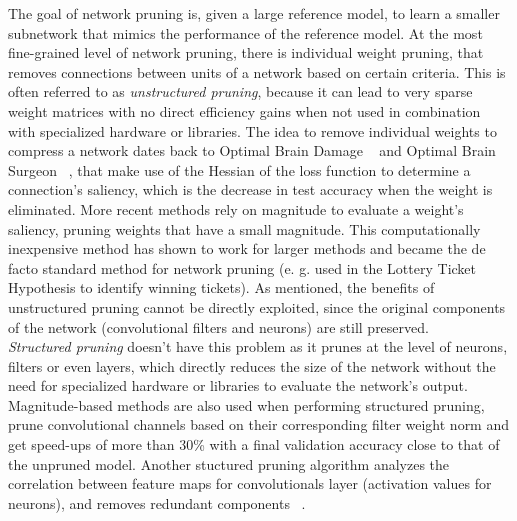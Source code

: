 The goal of network pruning is, given a large reference model, to learn a smaller subnetwork that mimics the performance of the reference model. At the most fine-grained level of network pruning, there is individual weight pruning, that removes connections between units of a network based on certain criteria. This is often referred to as \textit{unstructured pruning}, because it can lead to very sparse weight matrices with no direct efficiency gains when not used in combination with specialized hardware or libraries. The idea to remove individual weights to compress a network dates back to Optimal Brain Damage ~\autocite{lecun1990optimal} and Optimal Brain Surgeon ~\autocite{hassibi1993second}, that make use of the Hessian of the loss function to determine a connection's saliency, which is the decrease in test accuracy when the weight is eliminated. More recent methods rely on magnitude to evaluate a weight's saliency, pruning weights that have a small magnitude. This computationally inexpensive method has shown to work for larger methods and became the de
facto standard method for network pruning (e. g. used in the Lottery Ticket Hypothesis to identify winning tickets). As mentioned, the benefits of unstructured pruning cannot be directly exploited, since the original components of the network (convolutional filters and neurons) are still preserved. \\

\textit{Structured pruning} doesn't have this problem as it prunes at the level of neurons, filters or even layers, which directly reduces the size of the network without the need for specialized hardware or libraries to evaluate the network's output. Magnitude-based methods are also used when performing structured pruning, \cite{li2016pruning} prune convolutional channels based on their corresponding filter weight norm and get speed-ups of more than 30\% with a final validation accuracy close to that of the unpruned model. Another stuctured pruning algorithm analyzes the correlation between feature maps for convolutionals layer (activation values for neurons), and removes redundant components ~\autocite{suau2019filter}. \\

